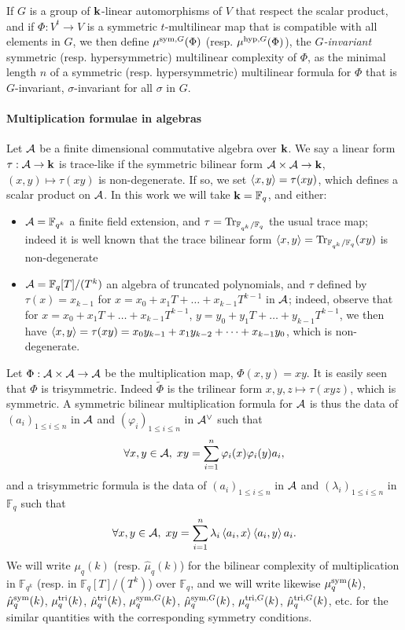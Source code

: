 \documentclass[11pt]{article}
\begin{document}
If $G$ is a group of $\mathbf{k}$-linear automorphisms of $V$
that respect the scalar product, and if $\Phi:V^t\to V$ is a symmetric $t$-multilinear map that is compatible with all elements in $G$,
we then define $\mu^{\textrm{sym},G}(\Phi)$ (resp. $\mu^{\textrm{hyp},G}(\Phi)$),
the \emph{$G$-invariant} symmetric (resp. hypersymmetric) multilinear complexity of $\Phi$,
as the minimal length $n$ of a symmetric (resp. hypersymmetric) multilinear formula for $\Phi$ that is $G$-invariant, \ie $\sigma$-invariant for all $\sigma$ in $G$. 


\paragraph{Multiplication formulae in algebras}

Let $\mathcal{A}$ be a finite dimensional commutative algebra over $\mathbf{k}$.
We say a linear form $\tau:\mathcal{A}\to\mathbf{k}$ is trace-like if the symmetric bilinear form $\mathcal{A}\times\mathcal{A}\to\mathbf{k}$, $(x,y)\mapsto\tau(xy)$ is non-degenerate.
If so, we set $\left\langle x,y\right\rangle=\tau(xy)$, which defines a scalar product on $\mathcal{A}$.
In this work we will take $\mathbf{k}=\mathbb{F}_q$, and either:
\begin{itemize}
\item $\mathcal{A}=\mathbb{F}_{q^k}$ a finite field extension, and $\tau=\operatorname{Tr}_{\mathbb{F}_{q^k}/\mathbb{F}_q}$ the usual trace map; indeed it is well known that the trace bilinear form $\left\langle x,y\right\rangle=\operatorname{Tr}_{\mathbb{F}_{q^k}/\mathbb{F}_q}(xy)$ is non-degenerate
\item $\mathcal{A}=\mathbb{F}_q[T]/(T^k)$ an algebra of truncated polynomials,
and $\tau$ defined by $\tau(x)=x_{k-1}$ for $x=x_0+x_1T+\dots+x_{k-1}T^{k-1}$ in $\mathcal{A}$;
indeed, observe that for $x=x_0+x_1T+\dots+x_{k-1}T^{k-1}$, $y=y_0+y_1T+\dots+y_{k-1}T^{k-1}$,
we then have $\left\langle x,y\right\rangle=\tau(xy)=x_0y_{k-1}+x_1y_{k-2}+\dots+x_{k-1}y_0$, which is non-degenerate.
\end{itemize}
Let $\Phi:\mathcal{A}\times\mathcal{A}\to\mathcal{A}$ be the multiplication map, $\Phi(x,y)=xy$.
It is easily seen that $\Phi$ is trisymmetric.
Indeed $\widetilde{\Phi}$ is the trilinear form $x,y,z\mapsto \tau(xyz)$,
which is symmetric.
A symmetric bilinear multiplication formula for $\mathcal{A}$ is thus the data
of $(a_i)_{1\leq i\leq n}$ in $\mathcal{A}$ and $(\varphi_i)_{1\leq i\leq n}$ in $\mathcal{A}^\vee$ such that
\begin{equation}
\forall x, y\in\mathcal{A},\;xy = \sum_{i=1}^{n}\varphi_i(x)\varphi_i(y)a_i,
\label{eq:sym-tr}
\end{equation}
and a trisymmetric formula is the data of $(a_i)_{1\leq i\leq n}$ in $\mathcal{A}$
and $(\lambda_i)_{1\leq i\leq n}$ in $\mathbb{F}_q$ such that
\begin{equation}
\forall x, y\in\mathcal{A},\;xy = \sum_{i=1}^{n}\lambda_i\left\langle a_i,x\right\rangle\left\langle a_i,y\right\rangle a_i.
\label{eq:tri-sym}
\end{equation}
We will write $\mu_q(k)$ (resp. $\hat\mu_q(k)$) for the bilinear complexity of multiplication in $\mathbb{F}_{q^k}$ (resp. in $\mathbb{F}_q[T]/(T^k)$) over $\mathbb{F}_q$,
and we will write likewise $\mu^{\textrm{sym}}_q(k)$, $\hat\mu^{\textrm{sym}}_q(k)$, $\mu^{\textrm{tri}}_q(k)$, $\hat\mu^{\textrm{tri}}_q(k)$, $\mu^{\textrm{sym},G}_q(k)$, $\hat\mu^{\textrm{sym},G}_q(k)$, $\mu^{\textrm{tri},G}_q(k)$, $\hat\mu^{\textrm{tri},G}_q(k)$, etc.
for the similar quantities with the corresponding symmetry conditions.
\end{document}
